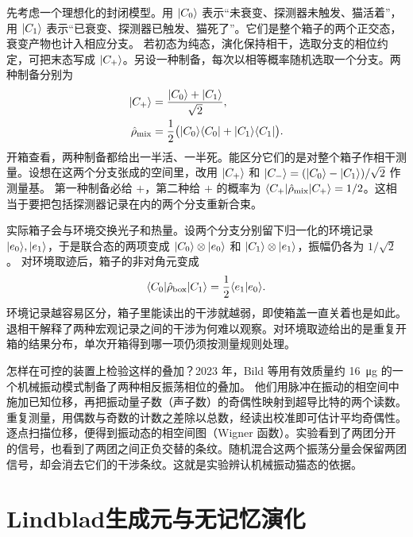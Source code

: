 先考虑一个理想化的封闭模型。用 $\lvert C_0\rangle$ 表示“未衰变、探测器未触发、猫活着”，用 $\lvert C_1\rangle$ 表示“已衰变、探测器已触发、猫死了”。它们是整个箱子的两个正交态，衰变产物也计入相应分支。
若初态为纯态，演化保持相干，选取分支的相位约定，可把末态写成 $\lvert C_+\rangle$。另设一种制备，每次以相等概率随机选取一个分支。两种制备分别为
\begin{subequations}\label{eq:qm-cat-preparations}
    \begin{align}
        \lvert C_+\rangle &= \frac{\lvert C_0\rangle + \lvert C_1\rangle}{\sqrt2},\\
        \hat{\rho}_{\mathrm{mix}} &= \frac12\bigl(\lvert C_0\rangle\langle C_0\rvert + \lvert C_1\rangle\langle C_1\rvert\bigr) .
    \end{align}
\end{subequations}
开箱查看，两种制备都给出一半活、一半死。能区分它们的是对整个箱子作相干测量。设想在这两个分支张成的空间里，改用 $\lvert C_+\rangle$ 和 $\lvert C_-\rangle = (\lvert C_0\rangle - \lvert C_1\rangle)/\sqrt2$ 作测量基。
第一种制备必给 $+$，第二种给 $+$ 的概率为 $\langle C_+\vert\hat{\rho}_{\mathrm{mix}}\vert C_+\rangle = 1/2$。这相当于要把包括探测器记录在内的两个分支重新合束。

实际箱子会与环境交换光子和热量。设两个分支分别留下归一化的环境记录 $\lvert e_0\rangle,\lvert e_1\rangle$，于是联合态的两项变成 $\lvert C_0\rangle\otimes\lvert e_0\rangle$ 和 $\lvert C_1\rangle\otimes\lvert e_1\rangle$，振幅仍各为 $1/\sqrt2$。
对环境取迹后，箱子的非对角元变成
\begin{equation}\label{eq:qm-cat-coherence}
    \langle C_0\vert\hat{\rho}_{\mathrm{box}}\vert C_1\rangle = \frac12\langle e_1\vert e_0\rangle.
\end{equation}
环境记录越容易区分，箱子里能读出的干涉就越弱，即使箱盖一直关着也是如此。退相干解释了两种宏观记录之间的干涉为何难以观察。对环境取迹给出的是重复开箱的结果分布，单次开箱得到哪一项仍须按测量规则处理。

怎样在可控的装置上检验这样的叠加？2023 年，\label{exp:qm-bild-cat}Bild 等用有效质量约 \qty{16}{\micro\gram} 的一个机械振动模式制备了两种相反振荡相位的叠加\cite{mechanical-cat}。
他们用脉冲在振动的相空间中施加已知位移，再把振动量子数（声子数）的奇偶性映射到超导比特的两个读数。重复测量，用偶数与奇数的计数之差除以总数，经读出校准即可估计平均奇偶性。
逐点扫描位移，便得到振动态的相空间图（Wigner 函数）。实验看到了两团分开的信号，也看到了两团之间正负交替的条纹。随机混合这两个振荡分量会保留两团信号，却会消去它们的干涉条纹。这就是实验辨认机械振动猫态的依据。

\section{Lindblad生成元与无记忆演化}

